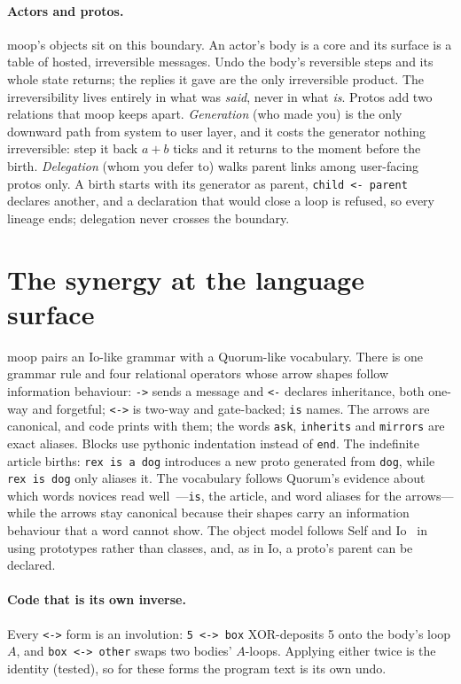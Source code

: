 \documentclass[11pt]{article}
\theoremstyle{definition}
\theoremstyle{remark}
\newcommand{\moop}{\textsf{moop}}
\newcommand{\code}[1]{\texttt{#1}}
\begin{document}
\paragraph{Actors and protos.}
\moop{}'s objects sit on this boundary. An actor's body is a core and
its surface is a table of hosted, irreversible messages. Undo the
body's reversible steps and its whole state returns; the replies it
gave are the only irreversible product. The irreversibility lives
entirely in what was \emph{said}, never in what \emph{is}. Protos add
two relations that \moop{} keeps apart. \emph{Generation} (who made
you) is the only downward path from system to user layer, and it costs
the generator nothing irreversible: step it back $a+b$ ticks and it
returns to the moment before the birth. \emph{Delegation} (whom you
defer to) walks parent links among user-facing protos only. A birth
starts with its generator as parent, \code{child <- parent} declares
another, and a declaration that would close a loop is refused, so every
lineage ends; delegation never crosses the boundary.

\section{The synergy at the language surface}
\label{sec:surface}

\moop{} pairs an Io-like grammar with a Quorum-like vocabulary. There
is one grammar rule and four relational operators whose arrow shapes
follow information behaviour: \code{->} sends a message and \code{<-}
declares inheritance, both one-way and forgetful; \code{<->} is two-way
and gate-backed; \code{is} names. The arrows are canonical, and code
prints with them; the words \code{ask}, \code{inherits} and
\code{mirrors} are exact aliases. Blocks use pythonic indentation
instead of \code{end}. The indefinite article births: \code{rex is a dog}
introduces a new proto generated from \code{dog}, while \code{rex is
dog} only aliases it. The vocabulary follows Quorum's evidence about
which words novices read well~\cite{stefik2013}---\code{is}, the
article, and word aliases for the arrows---while the arrows stay
canonical because their shapes carry an information behaviour that a
word cannot show. The object model follows Self and
Io~\cite{ungar1987,dekorte2005} in using prototypes rather than classes,
and, as in Io, a proto's parent can be declared.

\paragraph{Code that is its own inverse.}
Every \code{<->} form is an involution: \code{5 <-> box}
XOR-deposits 5 onto the body's loop $A$, and \code{box <-> other}
swaps two bodies' $A$-loops. Applying either twice is the identity
(tested), so for these forms the program text is its own undo.
\end{document}
